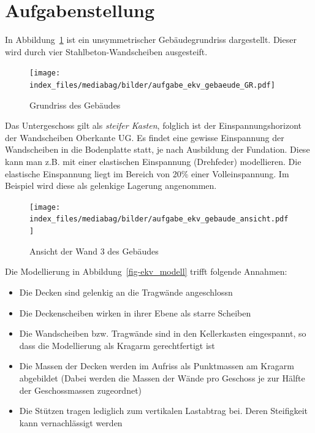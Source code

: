 \documentclass[
  letterpaper,
  DIV=11]{scrreprt}
\providecommand{\tightlist}{%
  \setlength{\itemsep}{0pt}\setlength{\parskip}{0pt}}\usepackage{longtable,booktabs,array}
\begin{document}
\hypertarget{aufgabenstellung-15}{%
\section{Aufgabenstellung}\label{aufgabenstellung-15}}

In Abbildung~\ref{fig-ekv_system} ist ein unsymmetrischer
Gebäudegrundriss dargestellt. Dieser wird durch vier
Stahlbeton-Wandscheiben ausgesteift.

\begin{figure}[H]

{\centering \texttt{[image: index\_files/mediabag/bilder/aufgabe\_ekv\_gebaeude\_GR.pdf]}

}

\caption{\label{fig-ekv_system}Grundriss des Gebäudes}

\end{figure}

Das Untergeschoss gilt als \emph{steifer Kasten}, folglich ist der
Einspannungshorizont der Wandscheiben Oberkante UG. Es findet eine
gewisse Einspannung der Wandscheiben in die Bodenplatte statt, je nach
Ausbildung der Fundation. Diese kann man z.B. mit einer elastischen
Einspannung (Drehfeder) modellieren. Die elastische Einspannung liegt im
Bereich von 20\% einer Volleinspannung. Im Beispiel wird diese als
gelenkige Lagerung angenommen.

\begin{figure}[H]

{\centering \texttt{[image: index\_files/mediabag/bilder/aufgabe\_ekv\_gebaude\_ansicht.pdf]}

}

\caption{\label{fig-ekv_ansicht}Ansicht der Wand 3 des Gebäudes}

\end{figure}

Die Modellierung in Abbildung~\ref{fig-ekv_modell} trifft folgende
Annahmen:

\begin{itemize}
\tightlist
\item
  Die Decken sind gelenkig an die Tragwände angeschlossn
\item
  Die Deckenscheiben wirken in ihrer Ebene als starre Scheiben
\item
  Die Wandscheiben bzw. Tragwände sind in den Kellerkasten eingespannt,
  so dass die Modellierung als Kragarm gerechtfertigt ist
\item
  Die Massen der Decken werden im Aufriss als Punktmassen am Kragarm
  abgebildet (Dabei werden die Massen der Wände pro Geschoss je zur
  Hälfte der Geschossmassen zugeordnet)
\item
  Die Stützen tragen lediglich zum vertikalen Lastabtrag bei. Deren
  Steifigkeit kann vernachlässigt werden
\end{itemize}
\end{document}
